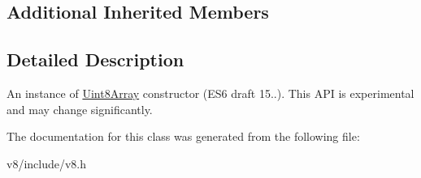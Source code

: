 \subsection*{Additional Inherited Members}


\subsection{Detailed Description}
An instance of \hyperlink{classv8_1_1Uint8Array}{Uint8\+Array} constructor (E\+S6 draft 15..). This A\+PI is experimental and may change significantly. 

The documentation for this class was generated from the following file\+:\begin{DoxyCompactItemize}
\item 
v8/include/v8.\+h\end{DoxyCompactItemize}
